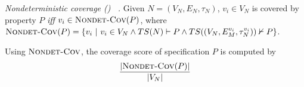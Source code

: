\begin{definition} {\emph{Nondeterministic coverage (\nondetcov) ~\cite{chockler2010coverage}.} }
\label{def:non-det}
Given $N = (V_N,E_N, \tau_N)$,
$v_i \in V_N$ is covered by property $P$ \emph{iff} $v_i \in \text{\sc Nondet-Cov} (P)$, where
$\text{\sc Nondet-Cov} (P) = \{ v_i~|~ v_i \in V_N \wedge TS(N) \vdash P \wedge TS((V_N, E^{v_i}_M, \tau^{v_i}_{N})) \nvdash P \}$.
\end{definition}
Using  $\text{\sc Nondet-Cov}$, the coverage score of specification $P$ is computed by
\[
   \frac{ | \text{\sc Nondet-Cov} (P) |}{|V_N|}
\]
\fi
%
%
%

%

%





